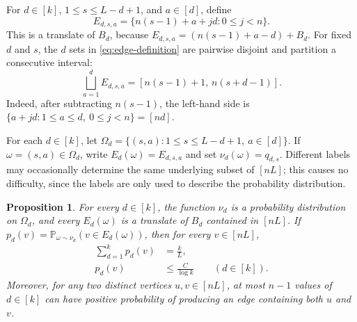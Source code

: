 \documentclass[twoside,12pt]{article}
\numberwithin{equation}{section}
\newtheorem{proposition}[theorem]{Proposition}
\newcommand{\Prob}{\mathbb{P}}
\begin{document}
For $d\in[k]$, $1\le s\le L-d+1$, and $a\in[d]$, define
\begin{equation}\label{eq:edge-definition}
        E_{d,s,a}=\{n(s-1)+a+jd:0\le j<n\}.
\end{equation}
This is a translate of $B_d$, because $E_{d,s,a}=(n(s-1)+a-d)+B_d$.  For fixed
$d$ and $s$, the $d$ sets in \eqref{eq:edge-definition} are pairwise disjoint
and partition a consecutive interval:
\begin{equation}\label{eq:bundle-partition}
        \bigsqcup_{a=1}^d E_{d,s,a}
        =[n(s-1)+1,\,n(s+d-1)].
\end{equation}
Indeed, after subtracting $n(s-1)$, the left-hand side is
$\{a+jd:1\le a\le d,\ 0\le j<n\}=[nd]$.

For each $d\in[k]$, let $\Omega_d=\{(s,a):1\le s\le L-d+1,\ a\in[d]\}$.  If
$\omega=(s,a)\in\Omega_d$, write $E_d(\omega)=E_{d,s,a}$ and set
$\nu_d(\omega)=q_{d,s}$.  Different labels may occasionally determine the same
underlying subset of $[nL]$; this causes no difficulty, since the labels are
only used to describe the probability distribution.

\begin{proposition}\label{prop:fractional-AP}
For every $d\in[k]$, the function $\nu_d$ is a probability distribution on
$\Omega_d$, and every $E_d(\omega)$ is a translate of $B_d$ contained in
$[nL]$.  If $p_d(v)=\Prob_{\omega\sim\nu_d}(v\in E_d(\omega))$, then for every
$v\in[nL]$,
\begin{align}
        \sum_{d=1}^k p_d(v)&=\frac{k}{L},\label{eq:actual-load}\\
        p_d(v)&\le\frac{C}{\log k}\qquad(d\in[k]).\label{eq:actual-diffuse}
\end{align}
Moreover, for any two distinct vertices $u,v\in[nL]$, at most $n-1$ values of
$d\in[k]$ can have positive probability of producing an edge containing both
$u$ and $v$.
\end{proposition}
\end{document}
